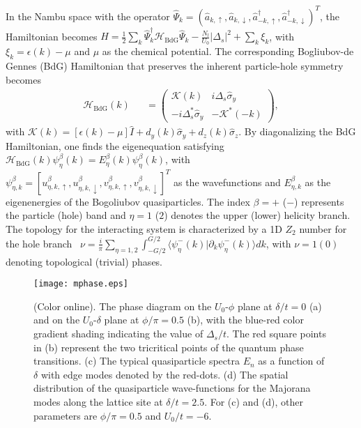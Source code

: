 \documentclass[twocolumn,prl,superscriptaddress,amsmath,amssymb]{revtex4} %
\begin{document}
In the Nambu space with the operator $\hat{\Psi}_{{{k}}}=(\hat{a}_{{ {k},\uparrow}},\hat{a}_{{{k},\downarrow}},\hat{a}_{{{-k},\uparrow}}^{\dagger}, \hat{a}_{{{-k},\downarrow}}^{\dagger})^{T}$, the Hamiltonian becomes ${H} = \frac{1}{2}\sum_{k} \hat{\Psi}_{{k}}^\dag{\mathcal H}_{\text{BdG}}\hat{\Psi}_{{k}} - \frac{N_l}{U_0}|\Delta_{s}|^2 +\sum_{{k}} \xi_k$, with $\xi_k=\epsilon(k) -\mu$ and $\mu$ as the chemical potential. The corresponding Bogliubov-de Gennes (BdG) Hamiltonian that preserves the inherent particle-hole symmetry becomes
\begin{eqnarray}
{\mathcal{H}}_{\text{BdG}}(k)
&&=\left(\begin{array}{cc}
{\mathcal K}(k) & i\Delta_{s}\hat{\sigma}_y \\
-i\Delta^*_{s}\hat{\sigma}_y & -{\mathcal K}^*({
-k})
\end{array}%
\right), \label{BdG}
\end{eqnarray}%
with ${\mathcal K}({k})= [\epsilon({{k}}) -\mu] \hat{I} + d_{y}(k)\hat{\sigma}_y+ d_{z}(k)\hat{\sigma}_z$. By diagonalizing the BdG Hamiltonian, one finds the eigenequation satisfying ${\mathcal{H}}_{\text{BdG}}({k}){\psi}_{\eta}^{\beta}(k)= E_{\eta}^{\beta}(k){\psi}_{\eta}^{\beta}(k)$, with ${\psi}^{\beta}_{\eta,{k}}=[u^{\beta}_{\eta,{k},\uparrow},u^{\beta}_{\eta,{ k},\downarrow},v^{\beta}_{\eta,{k},\uparrow},v^{\beta}_{\eta,{k},\downarrow}]^T$ as the wavefunctions and $E^{\beta}_{\eta,{k}}$ as the eigenenergies of the Bogoliubov quasiparticles. The index $\beta=+$ ($-$) represents the particle (hole) band and $\eta=1$ ($2$) denotes the upper (lower) helicity branch. The topology for the interacting system is characterized by a 1D $Z_2$ number for the hole branch~\cite{Takeshi13} $\nu = \frac{i}{\pi} \sum_{\eta=1,2} \int_{-G/2}^{G/2}\langle\psi_{\eta}^-(k)|\partial_k \psi_{\eta}^-(k)\rangle d k$, with $\nu=1(0)$ denoting topological (trivial) phases.

\begin{figure}[ht]
\texttt{[image: mphase.eps]}
\caption{(Color online). The phase diagram on the $U_0$-$\phi$ plane at $\delta/t=0$ (a) and on the $U_0$-$\delta$ plane at $\phi/\pi=0.5$ (b), with the blue-red color gradient shading indicating the value of $\Delta_s/t$. The red square points in (b) represent the two tricritical points of the quantum phase transitions. (c) The typical quasiparticle spectra $E_n$ as a function of $\delta$ with edge modes denoted by the red-dots. (d) The spatial distribution of the quasiparticle wave-functions for the Majorana modes along the lattice site at $\delta/t=2.5$. For (c) and (d), other parameters are $\phi/\pi=0.5$ and $U_0/t=-6$.}
\label{mphase}
\end{figure}
\end{document}
